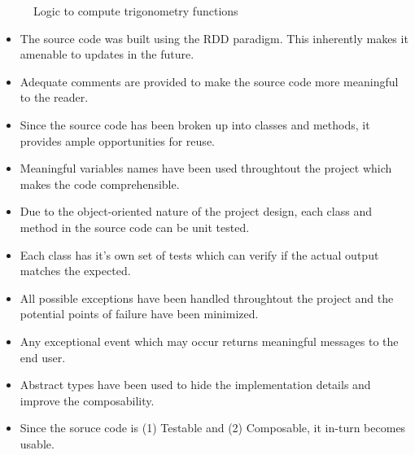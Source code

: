 \documentclass{report}
\begin{document}
    \begin{figure}[h!]
      \centering
      \caption{Logic to compute trigonometry functions}
      \label{fig:trigonometric Functions}
    \end{figure}
    \pagebreak

    \begin{itemize}
      \item {The source code was built using the RDD paradigm. This inherently makes it amenable to updates in the future.}
      \item {Adequate comments are provided to make the source code more meaningful to the reader.}
      \item {Since the source code has been broken up into classes and methods, it provides ample opportunities for reuse.}
      \item {Meaningful variables names have been used throughtout the project which makes the code comprehensible.}
      \item {Due to the object-oriented nature of the project design, each class and method in the source code can be unit tested. }
      \item {Each class has it's own set of tests which can verify if the actual output matches the expected.}
      \item {All possible exceptions have been handled throughtout the project and the potential points of failure have been minimized.}
      \item {Any exceptional event which may occur returns meaningful messages to the end user.}
      \item Abstract types have been used to hide the implementation details and improve the composability.
      \item Since the soruce code is (1) Testable and (2) Composable, it in-turn becomes usable. 
    \end{itemize}
\end{document}

